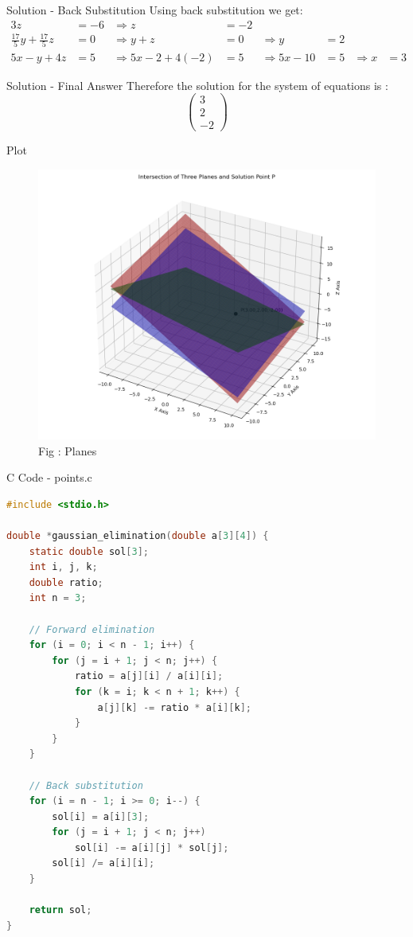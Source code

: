 \documentclass{beamer}
\numberwithin{equation}{section}
\providecommand{\myvec}[1]{\ensuremath{\begin{pmatrix}#1\end{pmatrix}}}
\begin{document}
\begin{frame}{Solution - Back Substitution}
Using back substitution we get:
\begin{align}
3z &= -6 &\Rightarrow z &= -2 \\
\tfrac{17}{5}y + \tfrac{17}{5}z &= 0 &\Rightarrow y+z &= 0 &\Rightarrow y &= 2\\
5x - y + 4z &= 5 &\Rightarrow 5x - 2 + 4(-2) &= 5 &\Rightarrow 5x -10 &= 5 &\Rightarrow x &= 3
\end{align}
\end{frame}

\begin{frame}{Solution - Final Answer}
Therefore the solution for the system of equations is :
\[
\myvec{3\\[0.5em]2\\[0.5em]-2}
\]
\end{frame}

\begin{frame}{Plot}
\begin{figure}[h!]
  \centering
  \includegraphics[width=0.8\columnwidth]{figs/Figure_1.png} 
   \caption*{Fig : Planes}
  \label{Fig1}
\end{figure}
\end{frame}

\begin{frame}[fragile]{C Code - points.c}
\begin{lstlisting}[language=C]
#include <stdio.h>

double *gaussian_elimination(double a[3][4]) {
    static double sol[3];
    int i, j, k;
    double ratio;
    int n = 3;

    // Forward elimination
    for (i = 0; i < n - 1; i++) {
        for (j = i + 1; j < n; j++) {
            ratio = a[j][i] / a[i][i];
            for (k = i; k < n + 1; k++) {
                a[j][k] -= ratio * a[i][k];
            }
        }
    }

    // Back substitution
    for (i = n - 1; i >= 0; i--) {
        sol[i] = a[i][3];
        for (j = i + 1; j < n; j++)
            sol[i] -= a[i][j] * sol[j];
        sol[i] /= a[i][i];
    }

    return sol;
}
\end{lstlisting}
\end{frame}
\end{document}
